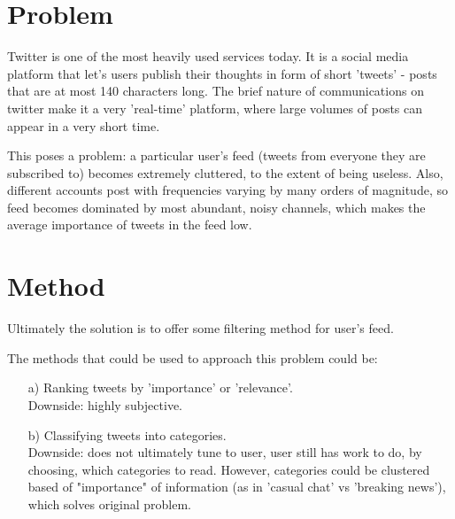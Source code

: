 \documentclass[%
 reprint,
 amsmath,amssymb,
 aps,
]{revtex4-1}
\begin{document}
\maketitle


\section{\label{sec:level1}Problem}


Twitter is one of the most heavily used services today. 
It is a social media platform that let's users publish their thoughts in form of short 'tweets' - posts that are at most 140 characters long.
The brief nature of communications on twitter make it a very 'real-time' platform, where large volumes of posts can appear in a very short time.

This poses a problem: a particular user's feed (tweets from everyone they are subscribed to) becomes extremely cluttered, to the extent of being useless. Also, different accounts post with frequencies varying by many orders of magnitude, so feed becomes dominated by most abundant, noisy channels, which makes the average importance of tweets in the feed low.



\section{Method}

Ultimately the solution is to offer some filtering method for user's feed.

The methods that could be used to approach this problem could be:
\begin{itemize}
    \item[a)] Ranking tweets by 'importance' or 'relevance'. \\
    Downside: highly subjective.

    \item[b)] Classifying tweets into categories.\\
	Downside: does not ultimately tune to user, user still has work to do, by choosing, which categories to read. 
	However, categories could be clustered based of "importance" of information (as in 'casual chat' vs 'breaking news'), which solves original problem.
\end{itemize}
\end{document}
